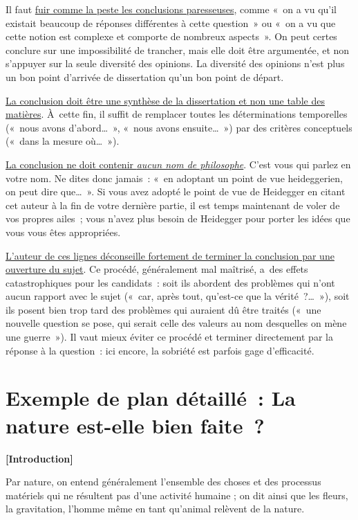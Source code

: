 \documentclass[a4paper,12pt]{article}
\begin{document}
Il faut \uline{fuir comme la peste les conclusions paresseuses}, comme « on a
vu qu'il existait beaucoup de réponses différentes à cette question » ou
« on a vu que cette notion est complexe et comporte de nombreux
aspects ». On peut certes conclure sur une impossibilité de trancher,
mais elle doit être argumentée, et non s'appuyer sur la seule diversité
des opinions. La diversité des opinions n'est plus un bon point
d'arrivée de dissertation qu'un bon point de départ.

\uline{La conclusion doit être une synthèse de la dissertation et non une
table des matières}. À cette fin, il suffit de remplacer toutes les
déterminations temporelles (« nous avons d'abord\ldots{} », « nous avons
ensuite\ldots{} ») par des critères conceptuels (« dans la mesure où\ldots{} »).

\uline{La conclusion ne doit contenir \emph{aucun nom de philosophe}}. C'est vous
qui parlez en votre nom. Ne dites donc jamais : « en adoptant un point
de vue heideggerien, on peut dire que\ldots{} ». Si vous avez adopté le point
de vue de Heidegger en citant cet auteur à la fin de votre dernière
partie, il est temps maintenant de voler de vos propres ailes ; vous
n'avez plus besoin de Heidegger pour porter les idées que vous vous êtes
appropriées.





\uline{L'auteur de ces lignes déconseille fortement de terminer la conclusion
par une ouverture du sujet}. Ce procédé, généralement mal maîtrisé,
a des effets catastrophiques pour les candidats : soit ils abordent des
problèmes qui n'ont aucun rapport avec le sujet (« car, après tout,
qu'est-ce que la vérité ?\ldots{} »), soit ils posent bien trop tard des
problèmes qui auraient dû être traités (« une nouvelle question se pose,
qui serait celle des valeurs au nom desquelles on mène une guerre »). Il
vaut mieux éviter ce procédé et terminer directement par la réponse à la
question : ici encore, la sobriété est parfois gage d'efficacité.

\section{Exemple de plan détaillé : La nature est-elle bien faite ?}
\label{sec-5}
\label{plandetaille}

\textbf{[Introduction]}

Par nature, on entend généralement l'ensemble des
choses et des processus matériels qui ne résultent pas d'une activité
humaine ; on dit ainsi que les fleurs, la gravitation, l'homme même en
tant qu'animal relèvent de la nature.
\end{document}

